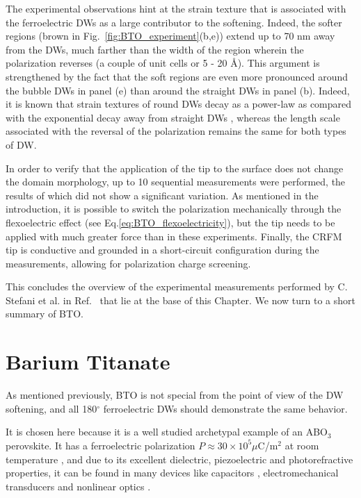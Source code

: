 The experimental observations hint at the strain texture that is associated with the ferroelectric DWs as a large contributor to the softening.
Indeed, the softer regions (brown in Fig.~\ref{fig:BTO_experiment}(b,e)) extend up to 70 nm away from the DWs, much farther than the width of the region wherein the polarization reverses (a couple of unit cells or 5 - 20 \AA \cite{Zhirnov1959}).
This argument is strengthened by the fact that the soft regions are even more pronounced around the bubble DWs in panel (e) than around the straight DWs in panel (b).
Indeed, it is known that strain textures of round DWs decay as a power-law as compared with the exponential decay away from straight DWs \cite{Landau1960}, whereas the length scale associated with the reversal of the polarization remains the same for both types of DW.

In order to verify that the application of the tip to the surface does not change the domain morphology, up to 10 sequential measurements were performed, the results of which did not show a significant variation.
As mentioned in the introduction, it is possible to switch the polarization mechanically through the flexoelectric effect (see Eq.\ref{eq:BTO_flexoelectricity}), but the tip needs to be applied with much greater force than in these experiments.
Finally, the CRFM tip is conductive and grounded in a short-circuit configuration during the measurements, allowing for polarization charge screening.

This concludes the overview of the experimental measurements performed by C. Stefani et al. in Ref.~\cite{Stefani2020} that lie at the base of this Chapter.
We now turn to a short summary of BTO.

\section{Barium Titanate \label{sec:BTO_crystal}}
As mentioned previously, BTO is not special from the point of view of the DW softening, and all 180$^\circ$ ferroelectric DWs should demonstrate the same behavior.

It is chosen here because it is a well studied archetypal example of an ABO$_3$ perovskite.
It has a ferroelectric polarization $P \approx 30 \times 10^5 \mu $C/m$^2$ at room temperature \cite{Mason1948, VonHippel1950, Ghosez1994}, and due to its excellent dielectric, piezoelectric and photorefractive properties, it can be found in many devices like capacitors \cite{American1963}, electromechanical transducers \cite{Schofield1957} and nonlinear optics \cite{Ramakanth2015}.

